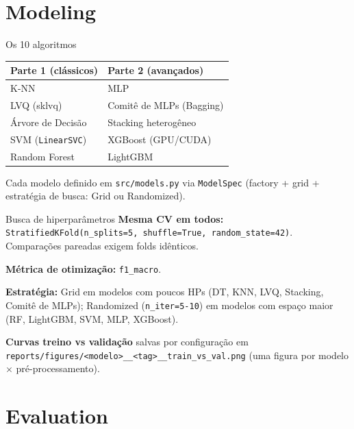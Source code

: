 \documentclass[aspectratio=169]{beamer}
\begin{document}
\section{Modeling}

\begin{frame}{Os 10 algoritmos}
\centering
\begin{tabular}{ll}
\toprule
\textbf{Parte 1 (clássicos)} & \textbf{Parte 2 (avançados)} \\
\midrule
K-NN & MLP \\
LVQ (sklvq) & Comitê de MLPs (Bagging) \\
Árvore de Decisão & Stacking heterogêneo \\
SVM (\texttt{LinearSVC}) & XGBoost (GPU/CUDA) \\
Random Forest & LightGBM \\
\bottomrule
\end{tabular}

\vspace{1em}
\small
Cada modelo definido em \texttt{src/models.py} via \texttt{ModelSpec} (factory + grid + estratégia de busca: Grid ou Randomized).
\end{frame}

\begin{frame}{Busca de hiperparâmetros}
\textbf{Mesma CV em todos:} \texttt{StratifiedKFold(n\_splits=5, shuffle=True, random\_state=42)}. Comparações pareadas exigem folds idênticos.

\vspace{0.5em}
\textbf{Métrica de otimização:} \texttt{f1\_macro}.

\vspace{0.5em}
\textbf{Estratégia:} Grid em modelos com poucos HPs (DT, KNN, LVQ, Stacking, Comitê de MLPs); Randomized (\texttt{n\_iter=5-10}) em modelos com espaço maior (RF, LightGBM, SVM, MLP, XGBoost).

\vspace{0.5em}
\textbf{Curvas treino vs validação} salvas por configuração em \texttt{reports/figures/<modelo>\_\_<tag>\_\_train\_vs\_val.png} (uma figura por modelo $\times$ pré-processamento).
\end{frame}

\section{Evaluation}
\end{document}
